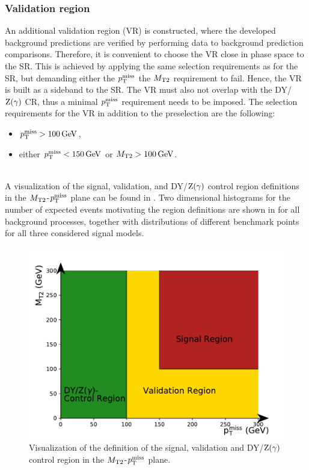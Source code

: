 \subsubsection{Validation region}
An additional validation region (VR) is constructed, where the developed background predictions are verified by performing data to background prediction comparisons. Therefore, it is convenient to choose the VR close in phase space to the SR. This is achieved by applying the same selection requirements as for the SR, but demanding either the $p_{\mathrm{T}}^\text{miss}$ the $M_{\mathrm{T2}}$ requirement to fail. Hence, the VR is built as a sideband to the SR. The VR must also not overlap with the DY/$\mathrm{Z}(\gamma)$ CR, thus a minimal $p_{\mathrm{T}}^\text{miss}$ requirement needs to be imposed. The selection requirements for the VR in addition to the preselection are the following:
\begin{itemize}
 \item $p_{\mathrm{T}}^\text{miss}>100\,\text{Ge\hspace{-.08em}V}$,
 \item either $p_{\mathrm{T}}^\text{miss}<150\,\text{Ge\hspace{-.08em}V}$ or $M_{\mathrm{T2}}>100\,\text{Ge\hspace{-.08em}V}$.
\end{itemize}
\\
A visualization of the signal, validation, and DY/$\mathrm{Z}(\gamma)$ control region definitions in the $M_{\mathrm{T2}}$-$p_{\mathrm{T}}^\text{miss}$ plane can be found in . Two dimensional histograms for the number of expected events motivating the region definitions are shown in  for all background processes, together with distributions of different benchmark points for all three considered signal models.
\begin{figure}[tbp]
 \centering
 \includegraphics[width=\pairwidth]{figures/figures/regions}
 \caption{Visualization of the definition of the signal, validation and DY/$\mathrm{Z}(\gamma)$ control region in the $M_{\mathrm{T2}}$-$p_{\mathrm{T}}^\text{miss}$ plane.}
 \label{fig:Regions}
\end{figure}
